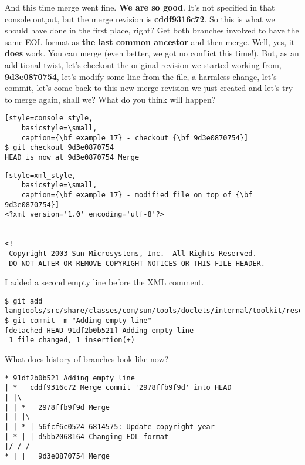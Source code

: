 And this time merge went fine. {\bf We are so good}. It's not specified in that console output, but the merge revision
is {\bf cddf9316c72}. So this is what we should have done in the first place, right? Get both branches involved to
have the same EOL-format as {\bf the last common ancestor} and then merge. Well, yes, it {\bf does} work. You can merge
(even better, we got no conflict this time!). But, as an additional twist, let's checkout the original revision we started
working from, {\bf 9d3e0870754}, let's modify some line from the file, a harmless change, let's commit, let's come back to
this new merge revision we just created and let's try to merge again, shall we? What do you think will happen?

\begin{lstlisting}[style=console_style,
	basicstyle=\small,
	caption={\bf example 17} - checkout {\bf 9d3e0870754}]
$ git checkout 9d3e0870754
HEAD is now at 9d3e0870754 Merge
\end{lstlisting}

\begin{lstlisting}[style=xml_style,
	basicstyle=\small,
	caption={\bf example 17} - modified file on top of {\bf 9d3e0870754}]
<?xml version='1.0' encoding='utf-8'?>


<!--
 Copyright 2003 Sun Microsystems, Inc.  All Rights Reserved.
 DO NOT ALTER OR REMOVE COPYRIGHT NOTICES OR THIS FILE HEADER.
\end{lstlisting}

I added a second empty line before the XML comment.

\begin{lstlisting}[style=console_style,
	basicstyle=\small,
	caption={\bf example 17} - wrapping up revision]
$ git add langtools/src/share/classes/com/sun/tools/doclets/internal/toolkit/resources/doclet.xml
$ git commit -m "Adding empty line"
[detached HEAD 91df2b0b521] Adding empty line
 1 file changed, 1 insertion(+)
\end{lstlisting}

What does history of branches look like now?

\begin{lstlisting}[style=console_style,
	basicstyle=\small,
	caption={\bf example 17} - current history]
* 91df2b0b521 Adding empty line
| *   cddf9316c72 Merge commit '2978ffb9f9d' into HEAD
| |\  
| | *   2978ffb9f9d Merge
| | |\  
| | * | 56fcf6c0524 6814575: Update copyright year
| * | | d5bb2068164 Changing EOL-format
|/ / /  
* | |   9d3e0870754 Merge
\end{lstlisting}

